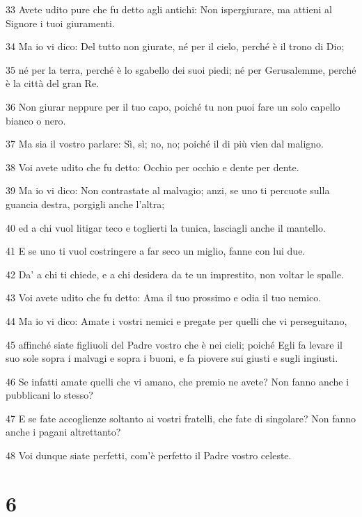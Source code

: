 \par 33 Avete udito pure che fu detto agli antichi: Non ispergiurare, ma attieni al Signore i tuoi giuramenti.
\par 34 Ma io vi dico: Del tutto non giurate, né per il cielo, perché è il trono di Dio;
\par 35 né per la terra, perché è lo sgabello dei suoi piedi; né per Gerusalemme, perché è la città del gran Re.
\par 36 Non giurar neppure per il tuo capo, poiché tu non puoi fare un solo capello bianco o nero.
\par 37 Ma sia il vostro parlare: Sì, sì; no, no; poiché il di più vien dal maligno.
\par 38 Voi avete udito che fu detto: Occhio per occhio e dente per dente.
\par 39 Ma io vi dico: Non contrastate al malvagio; anzi, se uno ti percuote sulla guancia destra, porgigli anche l'altra;
\par 40 ed a chi vuol litigar teco e toglierti la tunica, lasciagli anche il mantello.
\par 41 E se uno ti vuol costringere a far seco un miglio, fanne con lui due.
\par 42 Da' a chi ti chiede, e a chi desidera da te un imprestito, non voltar le spalle.
\par 43 Voi avete udito che fu detto: Ama il tuo prossimo e odia il tuo nemico.
\par 44 Ma io vi dico: Amate i vostri nemici e pregate per quelli che vi perseguitano,
\par 45 affinché siate figliuoli del Padre vostro che è nei cieli; poiché Egli fa levare il suo sole sopra i malvagi e sopra i buoni, e fa piovere sui giusti e sugli ingiusti.
\par 46 Se infatti amate quelli che vi amano, che premio ne avete? Non fanno anche i pubblicani lo stesso?
\par 47 E se fate accoglienze soltanto ai vostri fratelli, che fate di singolare? Non fanno anche i pagani altrettanto?
\par 48 Voi dunque siate perfetti, com'è perfetto il Padre vostro celeste.

\chapter{6}


